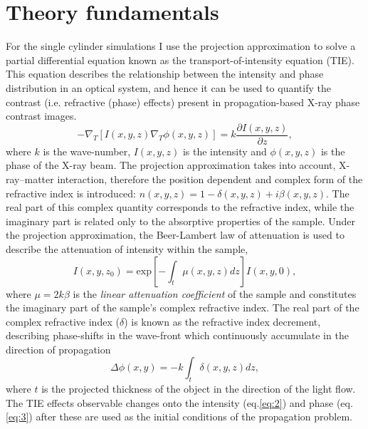 \documentclass[9pt, a4paper]{article}
\begin{document}
\section{Theory fundamentals}
For the single cylinder simulations I use the projection approximation to solve a partial differential equation known as the transport-of-intensity equation (TIE). This equation describes the relationship between the intensity and phase distribution in an optical system, and hence it can be used to quantify the contrast (i.e. refractive (phase) effects) present in propagation-based X-ray phase contrast images\cite{PagsTutes}.
\begin{equation}\label{eq:1}
-\nabla_{T} [I(x, y, z) \nabla_{T} \phi(x, y, z)] = k \frac{\partial I (x, y, z)}{\partial z},
\end{equation}
where $k$ is the wave-number, $I(x, y, z)$ is the intensity and $\phi(x, y, z)$ is the phase of the X-ray beam.
The projection approximation takes into account, X-ray--matter interaction, therefore the position dependent and complex form of the refractive index is introduced: $n(x, y, z) = 1 - \delta(x, y, z) + i \beta(x, y, z)$. The real part of this complex quantity corresponds to the refractive index, while the imaginary part is related only to the absorptive properties of the sample\cite{PagsTutes}.
Under the projection approximation, the Beer-Lambert law of attenuation is used to describe the attenuation of intensity within the sample,
\begin{equation}\label{eq:2}
I(x, y, z_0) = \mathrm{exp}[-\int_{t} \mu(x, y, z) dz] I(x, y, 0),
\end{equation}
where $\mu = 2k\beta$ is the \textit{linear attenuation coefficient} of the sample and constitutes the imaginary part of the sample's complex refractive index.
The real part of the complex refractive index ($\delta$) is known as the refractive index decrement, describing phase-shifts in the wave-front which continuously accumulate in the direction of propagation
\begin{equation}\label{eq:3}
\Delta \phi(x, y) = -k \int_{t}\delta(x, y, z)dz,
\end{equation}
where $t$ is the projected thickness of the object in the direction of the light flow.
The TIE effects observable changes onto the intensity (eq.\ref{eq:2}) and phase (eq.\ref{eq:3}) after these are used as the initial conditions of the propagation problem.
\end{document}
